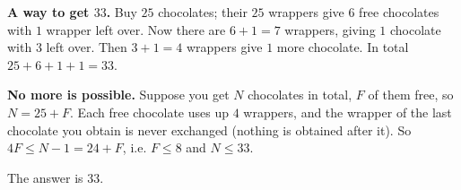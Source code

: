 \textbf{A way to get $33$.} Buy $25$ chocolates; their $25$ wrappers give $6$ free chocolates with $1$ wrapper left over. Now there are $6+1=7$ wrappers, giving $1$ chocolate with $3$ left over. Then $3+1=4$ wrappers give $1$ more chocolate. In total $25+6+1+1=33$.

\textbf{No more is possible.} Suppose you get $N$ chocolates in total, $F$ of them free, so $N=25+F$. Each free chocolate uses up $4$ wrappers, and the wrapper of the last chocolate you obtain is never exchanged (nothing is obtained after it). So $4F\le N-1=24+F$, i.e. $F\le8$ and $N\le33$.

The answer is $\boxed{33}$.

